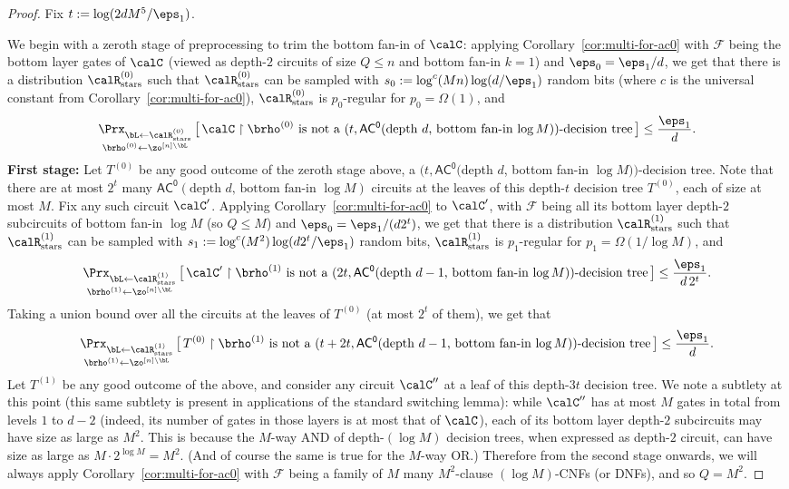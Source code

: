 \documentclass{toc}
\theoremstyle{plain}
\newcommand{\acz}{\mathsf{AC^0}}
\newcommand{\uhr}{\upharpoonright}
\newcommand{\stars}{\mathrm{stars}}
\begin{document}
\begin{proof} 
Fix $t := \log(2dM^5/\eps_1)$.  

\medskip 
{} We begin with a zeroth stage of preprocessing to trim the bottom fan-in of $\calC$: applying Corollary~\ref{cor:multi-for-ac0} with $\mathscr{F}$ being the bottom layer gates of $\calC$ (viewed as depth-$2$ circuits of size $Q \le n$ and bottom fan-in $k=1$) and $\eps_0 = \eps_1/d$, we get that there is a distribution $\calR_\stars^{(0)}$ such that $\calR_\stars^{(0)}$ can be sampled with $s_0 := \log^{c}(Mn)\log(d/\eps_1)$ random bits (where $c$ is the universal constant from Corollary~\ref{cor:multi-for-ac0}), $\calR_\stars^{(0)}$ is $p_0$-regular for $p_0 = \Omega(1)$,  and 
\[ \mathop{\Prx_{\bL\leftarrow\calR_\stars^{(0)}}}_{\brho^{(0)}\leftarrow\zo^{[n]\setminus \bL}}\big[\,\calC \uhr \brho^{(0)} \text{~is not a $(t, \acz(\text{depth $d$, bottom fan-in $\log M$}))$-decision tree}\, \big] \le \frac{\eps_1}{d}. \] 
{\bf First stage:} Let $T^{(0)}$ be any good outcome of the zeroth stage above, a $(t, \acz($depth $d$, bottom fan-in $\log M))$-decision tree. Note that there are at most $2^t$ many $\acz(\text{depth $d$, bottom fan-in $\log M$})$ circuits at the leaves of this depth-$t$ decision tree $T^{(0)}$, each of size at most $M$. Fix any such circuit $\calC'$. Applying Corollary~\ref{cor:multi-for-ac0} to $\calC'$, with $\mathscr{F}$ being all its bottom layer depth-$2$ subcircuits of bottom fan-in $\log M$ (so $Q \le M$) and $\eps_0 = \eps_1/(d2^t)$, we get that there is a distribution $\calR_\stars^{(1)}$ such that $\calR_\stars^{(1)}$ can be sampled with $s_1 := \log^{c}(M^2) \log(d2^t/\eps_1)$  random bits, $\calR_\stars^{(1)}$ is $p_1$-regular for $p_1 = \Omega(1/\log M)$, and  
\[ \mathop{\Prx_{\bL\leftarrow\calR_\stars^{(1)}}}_{\brho^{(1)}\leftarrow\zo^{[n]\setminus \bL}}\big[\,\calC' \uhr \brho^{(1)} \text{~is not a $(2t, \acz(\text{depth $d-1$, bottom fan-in $\log M$}))$-decision tree}\, \big] \le \frac{\eps_1}{d\,2^t}. \] 
Taking a union bound over all the circuits at the leaves of $T^{(0)}$ (at most $2^t$ of them), we get that 
\[ \mathop{\Prx_{\bL\leftarrow\calR_\stars^{(1)}}}_{\brho^{(1)}\leftarrow\zo^{[n]\setminus \bL}}\big[\,T^{(0)} \uhr \brho^{(1)} \text{~is not a $(t+2t, \acz(\text{depth $d-1$, bottom fan-in $\log M$}))$-decision tree}\, \big] \le \frac{\eps_1}{d}. \] 
Let $T^{(1)}$ be any good outcome of the above, and consider any circuit $\calC''$ at a leaf of this depth-$3t$ decision tree. We note a subtlety at this point (this same subtlety is present in applications of the standard switching lemma): while $\calC''$ has at most $M$ gates in total from levels $1$ to $d-2$ (indeed, its number of gates in those layers is at most that of $\calC$), each of its bottom layer depth-$2$ subcircuits may have size as large as $M^2$. This is because the $M$-way AND of depth-$(\log M)$ decision trees, when expressed as depth-$2$ circuit, can have size as large as $M \cdot 2^{\log M} = M^2$. (And of course the same is true for the $M$-way OR.) Therefore from the second stage onwards, we will always apply Corollary~\ref{cor:multi-for-ac0} with $\mathscr{F}$ being a family of $M$ many $M^2$-clause $(\log M)$-CNFs (or DNFs), and so $Q = M^2$. \smallskip


\end{proof}
\end{document}
